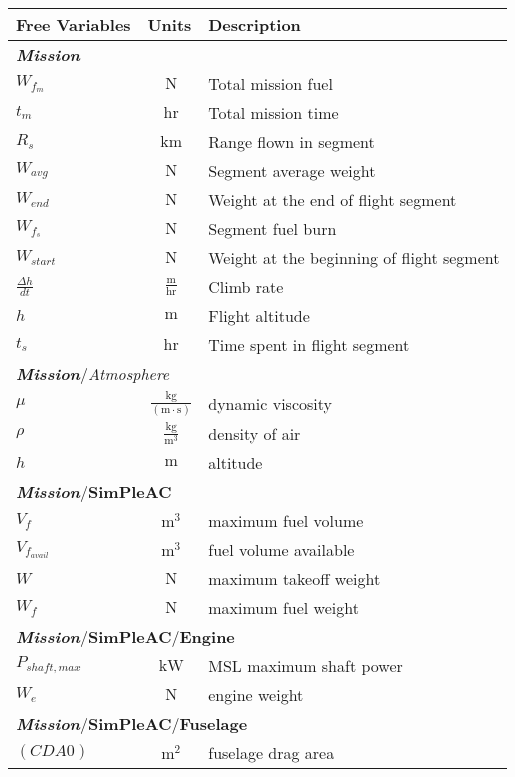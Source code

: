 {\footnotesize
\begin{longtable}{lcl}
\toprule
Free Variables & Units & Description \\ \midrule
\multicolumn{3}{l}{\textbf{\textit{Mission}}} \\
$W_{f_{m}}$ & $~\mathrm{N}$ & Total mission fuel \\
$t_m$ & $~\mathrm{hr}$ & Total mission time \\
$R_s$ & $~\mathrm{km}$ & Range flown in segment \\
$W_{avg}$ & $~\mathrm{N}$ & Segment average weight \\
$W_{end}$ & $~\mathrm{N}$ & Weight at the end of flight segment \\
$W_{f_s}$ & $~\mathrm{N}$ & Segment fuel burn \\
$W_{start}$ & $~\mathrm{N}$ & Weight at the beginning of flight segment \\
$\frac{\Delta h}{dt}$ & $~\mathrm{\tfrac{m}{hr}}$ & Climb rate \\
$h$ & $~\mathrm{m}$ & Flight altitude \\
$t_s$ & $~\mathrm{hr}$ & Time spent in flight segment \\
\hline
\multicolumn{3}{l}{\textbf{\textit{Mission}}/\textit{Atmosphere}} \\
$\mu$ & $~\mathrm{\tfrac{kg}{\left(m\cdot s\right)}}$ & dynamic viscosity \\
$\rho$ & $~\mathrm{\tfrac{kg}{m^{3}}}$ & density of air \\
$h$ & $~\mathrm{m}$ & altitude \\
\hline
\multicolumn{3}{l}{\textbf{\textit{Mission}}/\textbf{SimPleAC}} \\
$V_f$ & $~\mathrm{m^{3}}$ & maximum fuel volume \\
$V_{f_{avail}}$ & $~\mathrm{m^{3}}$ & fuel volume available \\
$W$ & $~\mathrm{N}$ & maximum takeoff weight \\
$W_f$ & $~\mathrm{N}$ & maximum fuel weight \\
\hline
\multicolumn{3}{l}{\textbf{\textit{Mission}}/\textbf{SimPleAC}/\textbf{Engine}} \\
$P_{shaft,max}$ & $~\mathrm{kW}$ & MSL maximum shaft power \\
$W_e$ & $~\mathrm{N}$ & engine weight \\
\hline
\multicolumn{3}{l}{\textbf{\textit{Mission}}/\textbf{SimPleAC}/\textbf{Fuselage}} \\
$(CDA0)$ & $~\mathrm{m^{2}}$ & fuselage drag area \\

\end{longtable}}
